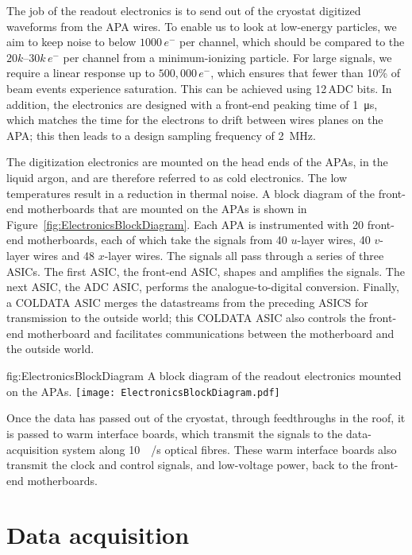 The job of the readout electronics is to send out of the cryostat digitized waveforms from the APA wires. To enable us to look at low-energy particles, we aim to keep noise to below $1000\,e^{-}$ per channel, which should be compared to the $20k$--$30k\,e^{-}$ per channel from a minimum-ionizing particle. For large signals, we require a linear response up to $500,000\,e^{-}$, which ensures that fewer than 10\% of beam events experience saturation. This can be achieved using 12\,ADC bits. In addition, the electronics are designed with a front-end peaking time of \SI{1}{\micro\second}, which matches the time for the electrons to drift between wires planes on the APA; this then leads to a design sampling frequency of \SI{2}{\mega\hertz}.

The digitization electronics are mounted on the head ends of the APAs, in the liquid argon, and are therefore referred to as cold electronics. The low temperatures result in a reduction in thermal noise. A block diagram of the front-end motherboards that are mounted on the APAs is shown in Figure~\ref{fig:ElectronicsBlockDiagram}. Each APA is instrumented with 20 front-end motherboards, each of which take the signals from 40 $u$-layer wires, 40 $v$-layer wires and 48 $x$-layer wires. The signals all pass through a series of three ASICs. The first ASIC, the front-end ASIC, shapes and amplifies the signals. The next ASIC, the ADC ASIC, performs the analogue-to-digital conversion. Finally, a COLDATA ASIC merges the datastreams from the preceding ASICS for transmission to the outside world; this COLDATA ASIC also controls the front-end motherboard and facilitates communications between the motherboard and the outside world.

\begin{dunefigure}{fig:ElectronicsBlockDiagram}
{A block diagram of the readout electronics mounted on the APAs.}
\texttt{[image: ElectronicsBlockDiagram.pdf]}
\end{dunefigure}

Once the data has passed out of the cryostat, through feedthroughs in the roof, it is passed to warm interface boards, which transmit the signals to the data-acquisition system along \SI{10}{\giga\byte/\second} optical fibres. These warm interface boards also transmit the clock and control signals, and low-voltage power, back to the front-end motherboards.

\section{Data acquisition}
\label{sec:fdsp-exec-daq}

